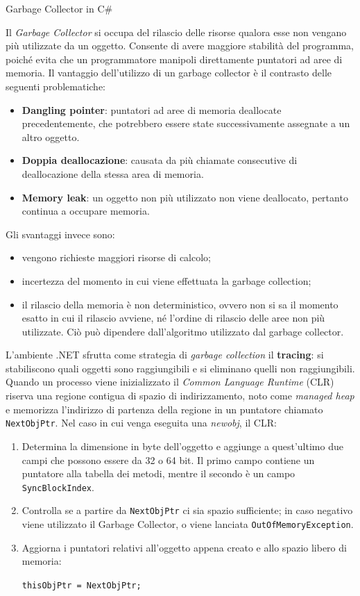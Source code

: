 \begin{problem}{1.5}
Garbage Collector in C\#
\end{problem}
\begin{solution}
Il \textit{Garbage Collector} si occupa del rilascio delle risorse qualora esse non vengano più utilizzate da un oggetto.
Consente di avere maggiore stabilità del programma, poiché evita che un programmatore manipoli direttamente puntatori ad aree di memoria.
\newline
Il vantaggio dell'utilizzo di un garbage collector è il contrasto delle seguenti problematiche:
\begin{itemize}
	\item \textbf{Dangling pointer}: puntatori ad aree di memoria deallocate precedentemente, che potrebbero essere state successivamente assegnate a un altro oggetto.
	\item \textbf{Doppia deallocazione}: causata da più chiamate consecutive di deallocazione della stessa area di memoria.
	\item \textbf{Memory leak}: un oggetto non più utilizzato non viene deallocato, pertanto continua a occupare memoria.
\end{itemize}
Gli svantaggi invece sono:
\begin{itemize}
	\item vengono richieste maggiori risorse di calcolo;
	\item incertezza del momento in cui viene effettuata la garbage collection;
	\item il rilascio della memoria è non deterministico, ovvero non si sa il momento esatto in cui il rilascio avviene, né l'ordine di rilascio delle aree non più utilizzate. Ciò può dipendere dall'algoritmo utilizzato dal garbage collector.
\end{itemize}
L'ambiente .NET sfrutta come strategia di \textit{garbage collection} il \textbf{tracing}: si stabiliscono quali oggetti sono raggiungibili e si eliminano quelli non raggiungibili.\newline
Quando un processo viene inizializzato il \textit{Common Language Runtime} (CLR) riserva una regione contigua di spazio di indirizzamento, noto come \textit{managed heap} e memorizza l'indirizzo di partenza della regione in un puntatore chiamato \texttt{NextObjPtr}.
Nel caso in cui venga eseguita una \textit{newobj}, il CLR:

\begin{enumerate}
	\item Determina la dimensione in byte dell'oggetto e aggiunge a quest'ultimo due campi che possono essere da 32 o 64 bit.
	Il primo campo contiene un puntatore alla tabella dei metodi, mentre il secondo è un campo \texttt{SyncBlockIndex}.
	\item Controlla se a partire da \texttt{NextObjPtr} ci sia spazio sufficiente; in caso negativo viene utilizzato il Garbage Collector, o viene lanciata \texttt{OutOfMemoryException}.
	\item Aggiorna i puntatori relativi all'oggetto appena creato e allo spazio libero di memoria:
	\begin{center}
		\texttt{thisObjPtr = NextObjPtr;}


\end{center}
\end{enumerate}
\end{solution}
